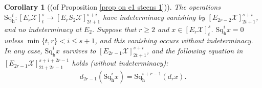 \documentclass[11pt]{amsart} \renewcommand{\baselinestretch}{1.2}
\theoremstyle{plain}
\newtheorem{cor}[thm]{Corollary}
\numberwithin{equation}{section} %
\theoremstyle{plain}
\newtheorem{cor}[thm]{Corollary}
\numberwithin{equation}{chapter} %
\renewcommand{\to}{\longrightarrow}
\newcommand{\calX}{\mathcal{X}}
\newcommand{\calx}{\mathcal{X}}
\newcommand{\Edownup}[5]{[E_{#1}^{#2}#3]^{#4}_{#5}}
\newcommand{\dhor}{_\mathrm{h}}
\newcommand{\Sqh}{\mathrm{Sq}\dhor}
\begin{document}
\begin{Operations on the Bousfield-Kan spectral sequence}
%
%


\begin{cor}[(of Proposition \ref{prop on e1 steens 1})]
\label{prop on e1 steens 1 composed with lift}
The operations $\Sqh^i:\Edownup{r}{}{\calx}{s}{t}\to \Edownup{r}{}{S_2\calx}{s+i}{2t+1}$ have indeterminacy vanishing by $\Edownup{2r-2}{}{\calx}{s+i}{2t+1}$, and  no indeterminacy at $E_2$.
Suppose that $r\geq 2$ and $x\in\Edownup{r}{}{\calX}{s}{t}$. %
$\Sqh^ix=0$ unless $\min\{t,r\}< i\leq s+1$,  and this vanishing occurs without indeterminacy.
In any case, $\Sqh^ix$ survives to $\Edownup{2r-1}{}{\calX}{s+i}{2t+1}$, and the following equation in $\Edownup{2r-1}{}{\calX}{s+i+2r-1}{2t+2r-1}$ holds (without indeterminacy): \[d_{2r-1}(\Sqh^ix)=\Sqh^{i+r-1}(d_rx).\]


\end{cor}
\end{Operations on the Bousfield-Kan spectral sequence}
\end{document}
